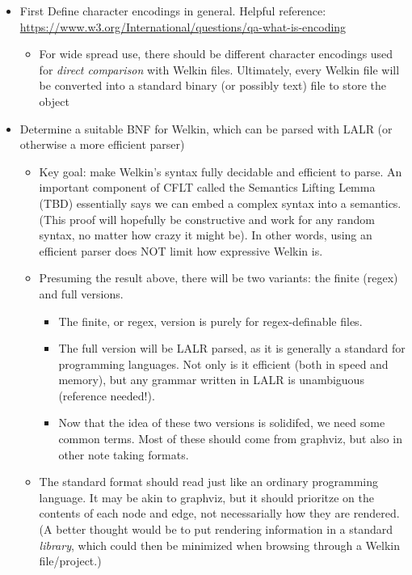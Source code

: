 \begin{itemize}
	\item First Define character encodings in general. Helpful reference: \url{https://www.w3.org/International/questions/qa-what-is-encoding}
	      \begin{itemize}
		      \item For wide spread use, there should be different character encodings used for \textit{direct comparison} with Welkin files. Ultimately, every Welkin file will be converted into a standard binary (or possibly text) file to store the object
	      \end{itemize}
	\item Determine a suitable BNF for Welkin, which can be parsed with LALR (or otherwise a more efficient parser)
	      \begin{itemize}
		      \item Key goal: make Welkin's syntax fully decidable and efficient to parse. An important component of CFLT called the Semantics Lifting Lemma (TBD) essentially says we can embed a complex syntax into a semantics. (This proof will hopefully be constructive and work for any random syntax, no matter how crazy it might be). In other words, using an efficient parser does NOT limit how expressive Welkin is.
		      \item Presuming the result above, there will be two variants: the finite (regex) and full versions.
		            \begin{itemize}
			            \item The finite, or regex, version is purely for regex-definable files.
			            \item The full version will be LALR parsed, as it is generally a standard for programming languages. Not only is it efficient (both in speed and memory), but any grammar written in LALR is unambiguous (reference needed!).
			            \item Now that the idea of these two versions is solidifed, we need some common terms. Most of these should come from graphviz, but also in other note taking formats.
		            \end{itemize}
		      \item The standard format should read just like an ordinary programming language. It may be akin to graphviz, but it should prioritze on the contents of each node and edge, not necessarially how they are rendered. (A better thought would be to put rendering information in a standard \textit{library}, which could then be minimized when browsing through a Welkin file/project.)
		            \begin{itemize}


\end{itemize}
\end{itemize}
\end{itemize}
